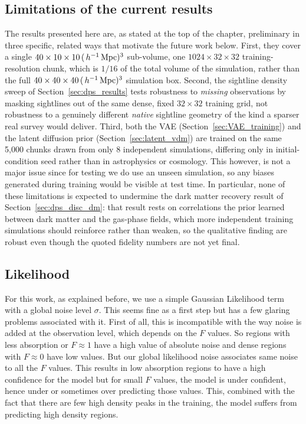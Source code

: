 \subsection{Limitations of the current results}
\label{sec:dps_disc_limits}

The results presented here are, as stated at the top of the chapter, preliminary in three specific, related ways that motivate the future work below. First, they cover a single $40\times10\times10\,(\,h^{-1}\,\mathrm{Mpc})^3$ sub-volume, one $1024\times32\times32$ training-resolution chunk, which is $1/16$ of the total volume of the simulation, rather than the full $40\times40\times40\,(\,h^{-1}\,\mathrm{Mpc})^3$ simulation box. Second, the sightline density sweep of Section~\ref{sec:dps_results} tests robustness to \emph{missing} observations by masking sightlines out of the same dense, fixed $32\times32$ training grid, not robustness to a genuinely different \emph{native} sightline geometry of the kind a sparser real survey would deliver. Third, both the VAE (Section~\ref{sec:VAE_training}) and the latent diffusion prior (Section~\ref{sec:latent_vdm}) are trained on the same 5,000 chunks drawn from only 8 independent simulations, differing only in initial-condition seed rather than in astrophysics or cosmology. This however, is not a major issue since for testing we do use an unseen simulation, so any biases generated during training would be visible at test time. In particular, none of these limitations is expected to undermine the dark matter recovery result of Section~\ref{sec:dps_disc_dm}: that result rests on correlations the prior learned between dark matter and the gas-phase fields, which more independent training simulations should reinforce rather than weaken, so the qualitative finding are robust even though the quoted fidelity numbers are not yet final.

\subsection{Likelihood}
For this work, as explained before, we use a simple Gaussian Likelihood term with a global noise level $\sigma$. This seems fine as a first step but has a few glaring problems associated with it. First of all, this is incompatible with the way noise is added at the observation level, which depends on the $F$ values. So regions with less absorption or $F\approx1$ have a high value of absolute noise and dense regions with $F\approx0$ have low values. But our global likelihood noise associates same noise to all the $F$ values. This results in low absorption regions to have a high confidence for the model but for small $F$ values, the model is under confident, hence under or sometimes over predicting those values. This, combined with the fact that there are few high density peaks in the training, the model suffers from predicting high density regions.

